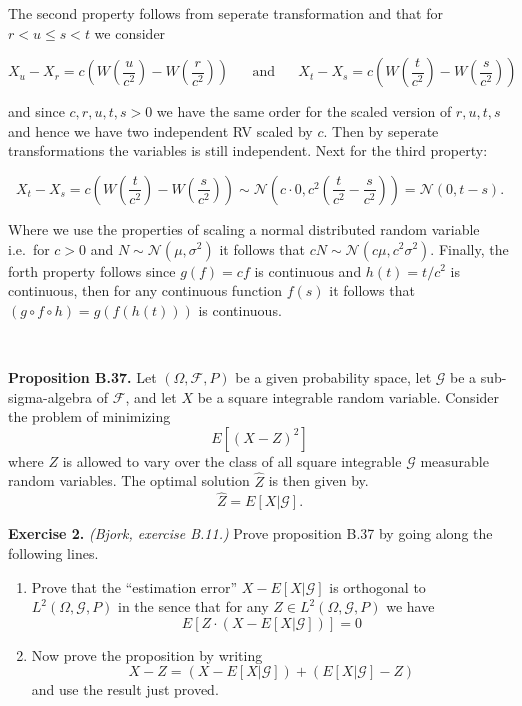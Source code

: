 \documentclass[a4paper,12pt,openany]{book}
\providecommand{\tightlist}{%
 \setlength{\itemsep}{0pt}\setlength{\parskip}{0pt}}
\begin{document}
The second property follows from seperate transformation and that for \(r<u\le s<t\) we consider

\[
X_u-X_r=c\left(W\left(\frac{u}{c^2}\right)-W\left(\frac{r}{c^2}\right)\right)\hspace{20pt}\text{and}\hspace{20pt}X_t-X_s=c\left(W\left(\frac{t}{c^2}\right)-W\left(\frac{s}{c^2}\right)\right)
\]

and since \(c,r,u,t,s>0\) we have the same order for the scaled version of \(r,u,t,s\) and hence we have two independent RV scaled by \(c\). Then by seperate transformations the variables is still independent. Next for the third property:

\[
X_t-X_s=c\left(W\left(\frac{t}{c^2}\right)-W\left(\frac{s}{c^2}\right)\right)\sim\mathcal{N}\left(c\cdot 0,c^2\left(\frac{t}{c^2}-\frac{s}{c^2}\right)\right)=\mathcal{N}(0,t-s).
\]

Where we use the properties of scaling a normal distributed random variable i.e.~for \(c>0\) and \(N\sim\mathcal{N}(\mu,\sigma ^2)\) it follows that \(c N\sim\mathcal{N}(c\mu,c^2\sigma ^2)\). Finally, the forth property follows since \(g(f)=cf\) is continuous and \(h(t)=t/c^2\) is continuous, then for any continuous function \(f(s)\) it follows that \((g \circ f\circ h)=g(f(h(t)))\) is continuous.

~

\textbf{Proposition B.37.} Let \((\Omega,\mathcal{F},P)\) be a given probability space, let \(\mathcal{G}\) be a sub-sigma-algebra of \(\mathcal{F}\), and let \(X\) be a square integrable random variable.
Consider the problem of minimizing
\[E\left[(X-Z)^2\right]\]
where \(Z\) is allowed to vary over the class of all square integrable \(\mathcal{G}\) measurable random variables. The optimal solution \(\hat{Z}\) is then given by.
\[\hat{Z}=E[X\vert\mathcal{G}].\]

\textbf{Exercise 2.} \emph{(Bjork, exercise B.11.)} Prove proposition B.37 by going along the following lines.

\begin{enumerate}
\def\labelenumi{\alph{enumi}.}
\tightlist
\item
  Prove that the ``estimation error'' \(X-E[X\vert\mathcal{G}]\) is orthogonal to \(L^2(\Omega,\mathcal{G},P)\) in the sence that for any \(Z\in L^2(\Omega,\mathcal{G},P)\) we have
  \[E[Z\cdot(X-E[X\vert\mathcal{G}])]=0\]
\item
  Now prove the proposition by writing
  \[X-Z=(X-E[X\vert\mathcal{G}])+(E[X\vert\mathcal{G}]-Z)\]
  and use the result just proved.
\end{enumerate}
\end{document}
